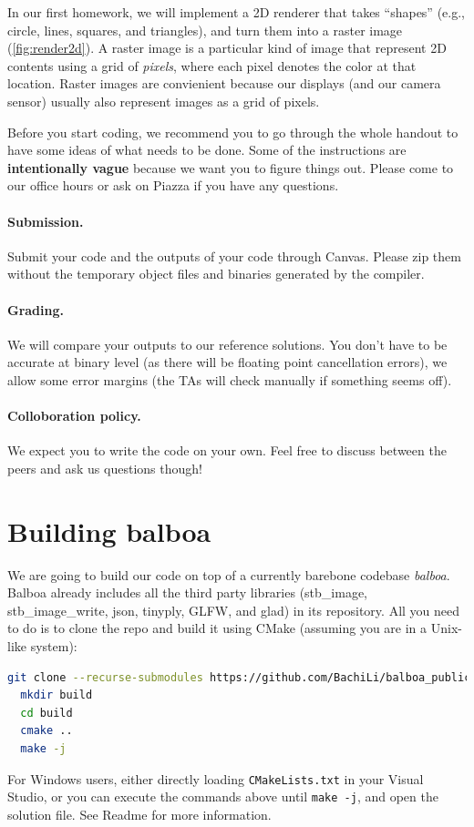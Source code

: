 In our first homework, we will implement a 2D renderer that takes ``shapes'' (e.g., circle, lines, squares, and triangles), and turn them into a raster image (\cref{fig:render2d}). A raster image is a particular kind of image that represent 2D contents using a grid of \emph{pixels}, where each pixel denotes the color at that location. Raster images are convienient because our displays (and our camera sensor) usually also represent images as a grid of pixels.

Before you start coding, we recommend you to go through the whole handout to have some ideas of what needs to be done. Some of the instructions are \textbf{intentionally vague} because we want you to figure things out. Please come to our office hours or ask on Piazza if you have any questions.

\paragraph{Submission.} Submit your code and the outputs of your code through Canvas. Please zip them without the temporary object files and binaries generated by the compiler.

\paragraph{Grading.} We will compare your outputs to our reference solutions. You don't have to be accurate at binary level (as there will be floating point cancellation errors), we allow some error margins (the TAs will check manually if something seems off).

\paragraph{Colloboration policy.} We expect you to write the code on your own. Feel free to discuss between the peers and ask us questions though!

\section{Building balboa}

We are going to build our code on top of a currently barebone codebase \emph{balboa}. Balboa already includes all the third party libraries (stb\_image, stb\_image\_write, json, tinyply, GLFW, and glad) in its repository.
All you need to do is to clone the repo and build it using CMake (assuming you are in a Unix-like system):
\begin{lstlisting}[language=bash]
  git clone --recurse-submodules https://github.com/BachiLi/balboa_public
  mkdir build
  cd build
  cmake ..
  make -j
\end{lstlisting}
For Windows users, either directly loading \lstinline{CMakeLists.txt} in your Visual Studio, or you can execute the commands above until \lstinline{make -j}, and open the solution file. See Readme for more information.

